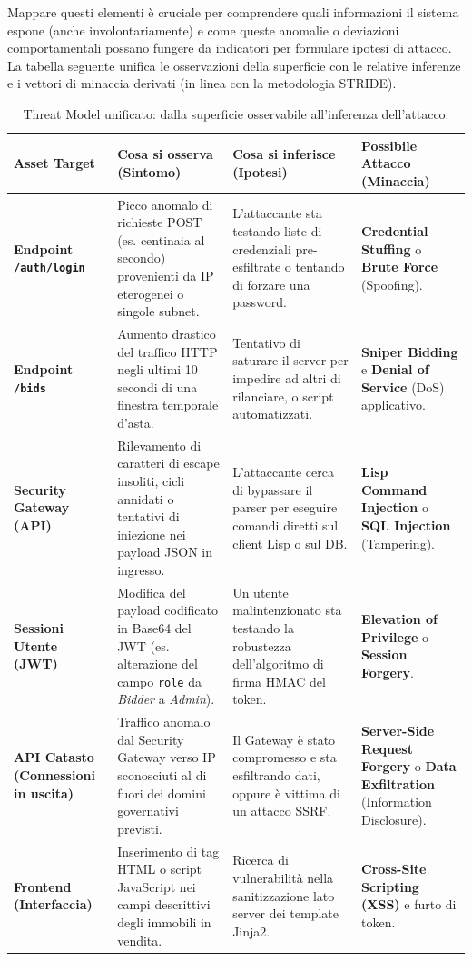 \documentclass[12pt,a4paper]{article}
\begin{document}
Mappare questi elementi è cruciale per comprendere quali informazioni il sistema espone (anche involontariamente) e come queste anomalie o deviazioni comportamentali possano fungere da indicatori per formulare ipotesi di attacco. La tabella seguente unifica le osservazioni della superficie con le relative inferenze e i vettori di minaccia derivati (in linea con la metodologia STRIDE).

\begin{table}[h]
\centering
\footnotesize
\renewcommand{\arraystretch}{1.5}
\begin{tabularx}{\textwidth}{>{\hsize=0.18\hsize\bfseries}X >{\hsize=0.28\hsize}X >{\hsize=0.28\hsize}X >{\hsize=0.26\hsize}X}
\toprule
Asset Target & Cosa si osserva (Sintomo) & Cosa si inferisce (Ipotesi) & Possibile Attacco (Minaccia) \\
\midrule
Endpoint \texttt{/auth/login} & Picco anomalo di richieste POST (es. centinaia al secondo) provenienti da IP eterogenei o singole subnet. & L'attaccante sta testando liste di credenziali pre-esfiltrate o tentando di forzare una password. & \textbf{Credential Stuffing} o \textbf{Brute Force} (Spoofing). \\
Endpoint \texttt{/bids} & Aumento drastico del traffico HTTP negli ultimi 10 secondi di una finestra temporale d'asta. & Tentativo di saturare il server per impedire ad altri di rilanciare, o script automatizzati. & \textbf{Sniper Bidding} e \textbf{Denial of Service} (DoS) applicativo. \\
Security Gateway (API) & Rilevamento di caratteri di escape insoliti, cicli annidati o tentativi di iniezione nei payload JSON in ingresso. & L'attaccante cerca di bypassare il parser per eseguire comandi diretti sul client Lisp o sul DB. & \textbf{Lisp Command Injection} o \textbf{SQL Injection} (Tampering). \\
Sessioni Utente (JWT) & Modifica del payload codificato in Base64 del JWT (es. alterazione del campo \texttt{role} da \textit{Bidder} a \textit{Admin}). & Un utente malintenzionato sta testando la robustezza dell'algoritmo di firma HMAC del token. & \textbf{Elevation of Privilege} o \textbf{Session Forgery}. \\
API Catasto (Connessioni in uscita) & Traffico anomalo dal Security Gateway verso IP sconosciuti al di fuori dei domini governativi previsti. & Il Gateway è stato compromesso e sta esfiltrando dati, oppure è vittima di un attacco SSRF. & \textbf{Server-Side Request Forgery} o \textbf{Data Exfiltration} (Information Disclosure). \\
Frontend (Interfaccia) & Inserimento di tag HTML o script JavaScript nei campi descrittivi degli immobili in vendita. & Ricerca di vulnerabilità nella sanitizzazione lato server dei template Jinja2. & \textbf{Cross-Site Scripting (XSS)} e furto di token. \\
\bottomrule
\end{tabularx}
\caption{Threat Model unificato: dalla superficie osservabile all'inferenza dell'attacco.}
\end{table}
\end{document}
